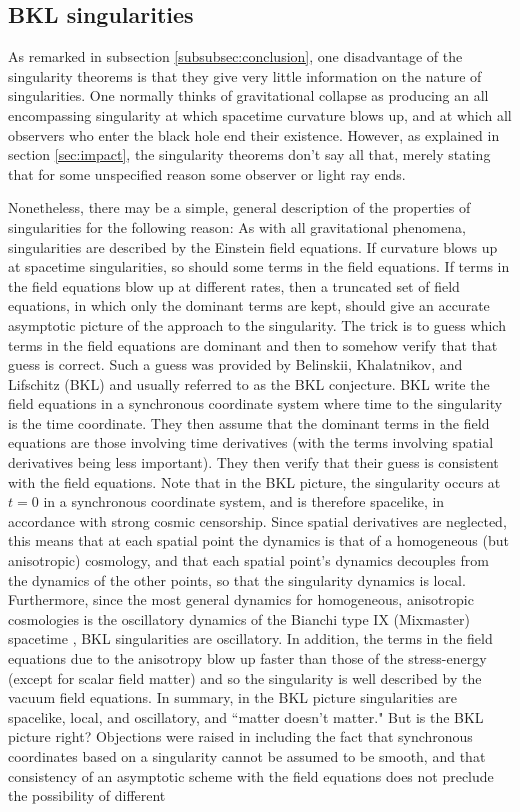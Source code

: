 \documentclass[12pt]{iopart}
\begin{document}
\subsection{BKL singularities}\label{subsec:BKL}

As remarked in subsection \ref{subsubsec:conclusion}, one disadvantage of the singularity theorems is that they give very little information on the nature of singularities.  One normally thinks of gravitational collapse as producing an all encompassing singularity at which spacetime curvature blows up, and at which all observers who enter the black hole end their existence.  However, as explained in section \ref{sec:impact}, the singularity theorems don't say all that, merely stating that for some unspecified reason some observer or light ray ends.  

Nonetheless, there may be a simple, general description of the properties of singularities for the following reason: As with all gravitational phenomena, singularities are described by the Einstein field equations.  If curvature blows up at spacetime singularities, so should some terms in the field equations.  If terms in the field equations blow up at different rates, then a truncated set of field equations, in which only the dominant terms are kept, should give an accurate asymptotic picture of the approach to the singularity.  The trick is to guess which terms in the field equations are dominant and then to somehow verify that that guess is correct.  Such a guess was provided by Belinskii, Khalatnikov, and Lifschitz (BKL)\cite{BKL,BKL1} and usually referred to as the BKL conjecture.  BKL write the field equations in a synchronous coordinate system where time to the singularity is the time coordinate.  They then assume that the dominant terms in the field equations are those involving time derivatives (with the terms involving spatial derivatives being less important).  They then verify that their guess is consistent with the field equations.  Note that in the BKL picture, the singularity occurs at $t=0$ in a synchronous coordinate system, and is therefore spacelike, in accordance with strong cosmic censorship.  Since spatial derivatives are neglected, this means that at each spatial point the dynamics is that of a homogeneous (but anisotropic) cosmology, and that each spatial point's dynamics decouples from the dynamics of the other points, so that the singularity dynamics is local.  Furthermore, since the most general dynamics for homogeneous, anisotropic cosmologies is the oscillatory dynamics of the Bianchi type IX (Mixmaster) spacetime \cite{RSh,Exact}, BKL singularities are oscillatory.  In addition, the terms in the field equations due to the anisotropy blow up faster than those of the stress-energy (except for scalar field matter) and so the singularity is well described by the vacuum field equations.  In summary, in the BKL picture singularities are spacelike, local, and oscillatory, and ``matter doesn't matter."  But is the BKL picture right?  Objections were raised in \cite{BT} including the fact that synchronous coordinates based on a singularity cannot be assumed to be smooth, and that consistency of an asymptotic scheme with the field equations does not preclude the possibility of different 
\end{document}
